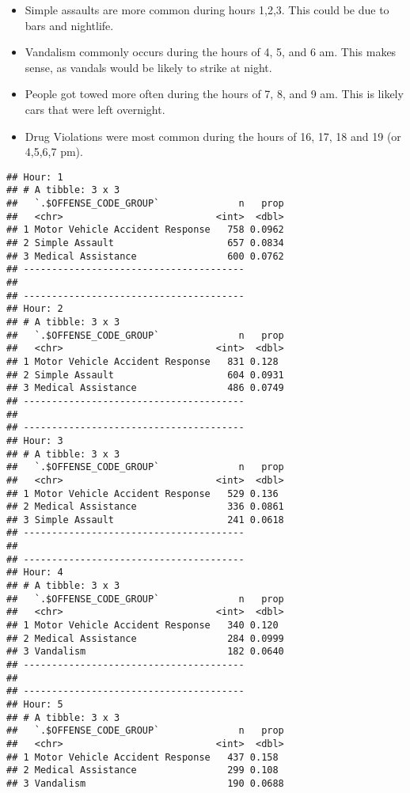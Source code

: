 \documentclass[]{article}
\providecommand{\tightlist}{%
  \setlength{\itemsep}{0pt}\setlength{\parskip}{0pt}}
\begin{document}
\begin{itemize}
\tightlist
\item
  Simple assaults are more common during hours 1,2,3. This could be due
  to bars and nightlife.
\item
  Vandalism commonly occurs during the hours of 4, 5, and 6 am. This
  makes sense, as vandals would be likely to strike at night.
\item
  People got towed more often during the hours of 7, 8, and 9 am. This
  is likely cars that were left overnight.
\item
  Drug Violations were most common during the hours of 16, 17, 18 and 19
  (or 4,5,6,7 pm).
\end{itemize}

\begin{verbatim}
## Hour: 1
## # A tibble: 3 x 3
##   `.$OFFENSE_CODE_GROUP`              n   prop
##   <chr>                           <int>  <dbl>
## 1 Motor Vehicle Accident Response   758 0.0962
## 2 Simple Assault                    657 0.0834
## 3 Medical Assistance                600 0.0762
## ---------------------------------------
## 
## ---------------------------------------
## Hour: 2
## # A tibble: 3 x 3
##   `.$OFFENSE_CODE_GROUP`              n   prop
##   <chr>                           <int>  <dbl>
## 1 Motor Vehicle Accident Response   831 0.128 
## 2 Simple Assault                    604 0.0931
## 3 Medical Assistance                486 0.0749
## ---------------------------------------
## 
## ---------------------------------------
## Hour: 3
## # A tibble: 3 x 3
##   `.$OFFENSE_CODE_GROUP`              n   prop
##   <chr>                           <int>  <dbl>
## 1 Motor Vehicle Accident Response   529 0.136 
## 2 Medical Assistance                336 0.0861
## 3 Simple Assault                    241 0.0618
## ---------------------------------------
## 
## ---------------------------------------
## Hour: 4
## # A tibble: 3 x 3
##   `.$OFFENSE_CODE_GROUP`              n   prop
##   <chr>                           <int>  <dbl>
## 1 Motor Vehicle Accident Response   340 0.120 
## 2 Medical Assistance                284 0.0999
## 3 Vandalism                         182 0.0640
## ---------------------------------------
## 
## ---------------------------------------
## Hour: 5
## # A tibble: 3 x 3
##   `.$OFFENSE_CODE_GROUP`              n   prop
##   <chr>                           <int>  <dbl>
## 1 Motor Vehicle Accident Response   437 0.158 
## 2 Medical Assistance                299 0.108 
## 3 Vandalism                         190 0.0688

\end{verbatim}
\end{document}
